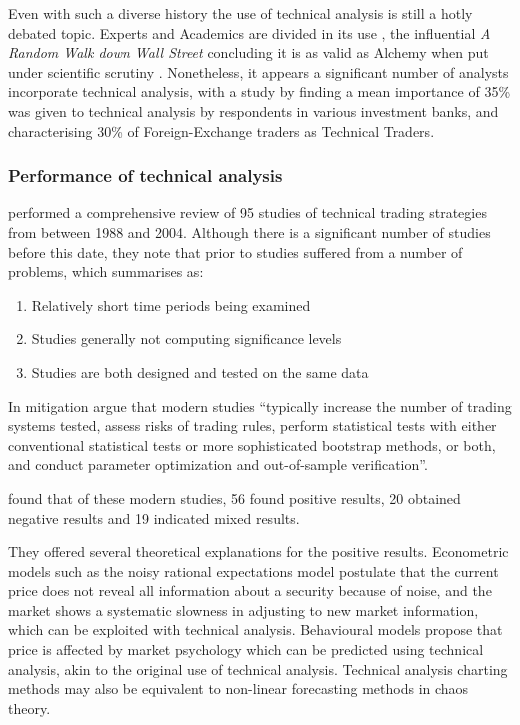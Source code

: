 \documentclass{article}
\theoremstyle{definition}
\begin{document}
Even with such a diverse history the use of technical analysis is still a hotly debated topic. Experts and Academics are divided in its use \citep{foundations}, the influential \textit{A Random Walk down Wall Street} concluding it is as valid as Alchemy when put under scientific scrutiny \cite[p.159]{randomwalk2012}. Nonetheless, it appears a significant number of analysts incorporate technical analysis, with a study by \cite{examininguse1997} finding a mean importance of 35\% was given to technical analysis by respondents in various investment banks, and \cite{cheung2000currency} characterising 30\% of Foreign-Exchange traders as Technical Traders. 

\subsubsection{Performance of technical analysis}
\label{taperformance}
\cite{taprofitability} performed a comprehensive review of 95 studies of technical trading strategies from between 1988 and 2004. Although there is a significant number of studies before this date, they note that prior to \cite{lukac1988} studies suffered from a number of problems, which \cite{brock1992} summarises as:

\begin{enumerate}[label=\roman*]
\item Relatively short time periods being examined 
\item Studies generally not computing significance levels 
\item Studies are both designed and tested on the same data
\end{enumerate}

In mitigation \cite{taprofitability} argue that modern studies ``typically
increase the number of trading systems tested, assess risks of trading rules,
perform statistical tests with either conventional statistical tests or more sophisticated bootstrap methods, or both, and conduct parameter optimization and out-of-sample verification''.

\cite{taprofitability} found that of these modern studies, 56 found positive results, 20 obtained negative results and 19 indicated mixed results. 

They offered several theoretical explanations for the positive results. Econometric models such as the noisy rational expectations model postulate that the current price does not reveal all information about a security because of noise, and the market shows a systematic slowness in adjusting to new market information, which can be exploited with technical analysis. Behavioural models propose that price is affected by market psychology which can be predicted using technical analysis, akin to the original use of technical analysis. Technical analysis charting methods may also be equivalent to non-linear forecasting methods in chaos theory.
\end{document}
